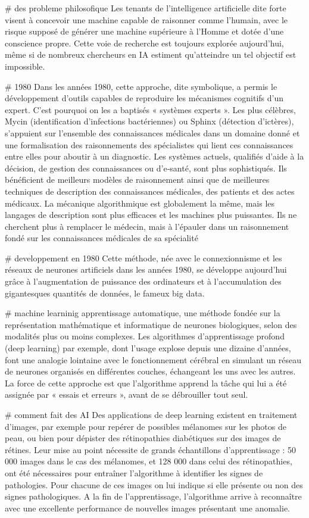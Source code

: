 # des probleme philosofique
Les tenants de l’intelligence artificielle dite forte visent à concevoir une
machine capable de raisonner comme l’humain, avec le risque supposé de générer
une machine supérieure à l’Homme et dotée d’une conscience propre. Cette voie
de recherche est toujours explorée aujourd’hui, même si de nombreux chercheurs
en IA estiment qu’atteindre un tel objectif est impossible. 

# 1980
Dans les années 1980, cette approche, dite symbolique, a permis le
développement d’outils capables de reproduire les mécanismes cognitifs d’un
expert. C’est pourquoi on les a baptisés « systèmes experts ». Les plus
célèbres, Mycin (identification d’infections bactériennes) ou Sphinx (détection
d’ictères), s’appuient sur l’ensemble des connaissances médicales dans un
domaine donné et une formalisation des raisonnements des spécialistes qui lient
ces connaissances entre elles pour aboutir à un diagnostic. Les systèmes
actuels, qualifiés d’aide à la décision, de gestion des connaissances ou
d’e‑santé, sont plus sophistiqués. Ils bénéficient de meilleurs modèles de
raisonnement ainsi que de meilleures techniques de description des
connaissances médicales, des patients et des actes médicaux. La mécanique
algorithmique est globalement la même, mais les langages de description sont
plus efficaces et les machines plus puissantes. Ils ne cherchent plus à
remplacer le médecin, mais à l’épauler dans un raisonnement fondé sur les
connaissances médicales de sa spécialité

# developpement en 1980
Cette méthode, née avec le connexionnisme et les réseaux de neurones
artificiels dans les années 1980, se développe aujourd’hui grâce à
l’augmentation de puissance des ordinateurs et à l’accumulation des
gigantesques quantités de données, le fameux big data.

# machine learninig
apprentissage automatique, une méthode fondée sur la représentation
mathématique et informatique de neurones biologiques, selon des modalités plus
ou moins complexes. Les algorithmes d’apprentissage profond (deep learning) par
exemple, dont l’usage explose depuis une dizaine d’années, font une analogie
lointaine avec le fonctionnement cérébral en simulant un réseau de neurones
organisés en différentes couches, échangeant les uns avec les autres. La force
de cette approche est que l’algorithme apprend la tâche qui lui a été assignée
par « essais et erreurs », avant de se débrouiller tout seul. 

# comment fait des AI
Des applications de deep learning existent en traitement d’images, par exemple
pour repérer de possibles mélanomes sur les photos de peau, ou bien pour
dépister des rétinopathies diabétiques sur des images de rétines. Leur mise au
point nécessite de grands échantillons d’apprentissage : 50 000 images dans le
cas des mélanomes, et 128 000 dans celui des rétinopathies, ont été nécessaires
pour entraîner l’algorithme à identifier les signes de pathologies. Pour
chacune de ces images on lui indique si elle présente ou non des signes
pathologiques. A la fin de l’apprentissage, l’algorithme arrive à reconnaître
avec une excellente performance de nouvelles images présentant une anomalie. 


